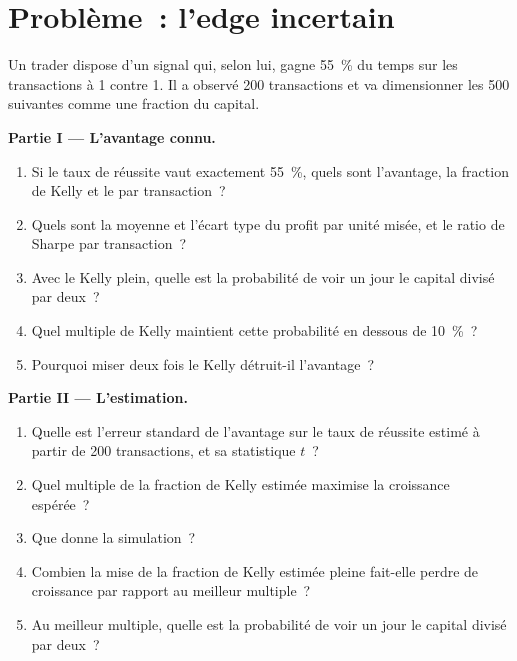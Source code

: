 \section{Problème~: l'edge incertain}

\begin{problem}\label{pb:m2:thinking-in-expected-value:1}
Un trader dispose d'un signal qui, selon lui, gagne 55~\% du temps sur les transactions à  1 contre 1. Il
a observé 200 transactions et va dimensionner les 500 suivantes comme une fraction du capital.

\medskip\noindent\textbf{Partie I --- L'avantage connu.}
\begin{enumerate}
\item Si le taux de réussite vaut exactement 55~\%, quels sont l'avantage, la fraction de Kelly et le  par transaction~?
\item Quels sont la moyenne et l'écart type du profit par unité misée, et le
ratio de Sharpe par transaction~?
\item Avec le Kelly plein, quelle est la probabilité de voir un jour le capital divisé par deux~?
\item Quel multiple de Kelly maintient cette probabilité en dessous de 10~\%~?
\item Pourquoi miser deux fois le Kelly détruit-il l'avantage~?
\end{enumerate}

\medskip\noindent\textbf{Partie II --- L'estimation.}
\begin{enumerate}[resume]
\item Quelle est l'erreur standard de l'avantage sur le taux de réussite estimé à partir de 200 transactions, et sa
statistique $t$~?
\item Quel multiple de la fraction de Kelly estimée maximise la croissance espérée~?
\item Que donne la simulation~?
\item Combien la mise de la fraction de Kelly estimée pleine fait-elle perdre de croissance par rapport au
meilleur multiple~?
\item Au meilleur multiple, quelle est la probabilité de voir un jour le capital divisé par deux~?
\end{enumerate}


\end{problem}
